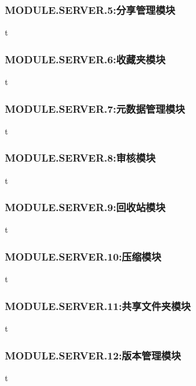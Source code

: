 \subsubsection{MODULE.SERVER.5:分享管理模块}
t

\subsubsection{MODULE.SERVER.6:收藏夹模块}
t

\subsubsection{MODULE.SERVER.7:元数据管理模块}
t

\subsubsection{MODULE.SERVER.8:审核模块} 
t

\subsubsection{MODULE.SERVER.9:回收站模块}
t 

\subsubsection{MODULE.SERVER.10:压缩模块}
t

\subsubsection{MODULE.SERVER.11:共享文件夹模块}
t

\subsubsection{MODULE.SERVER.12:版本管理模块}
t






